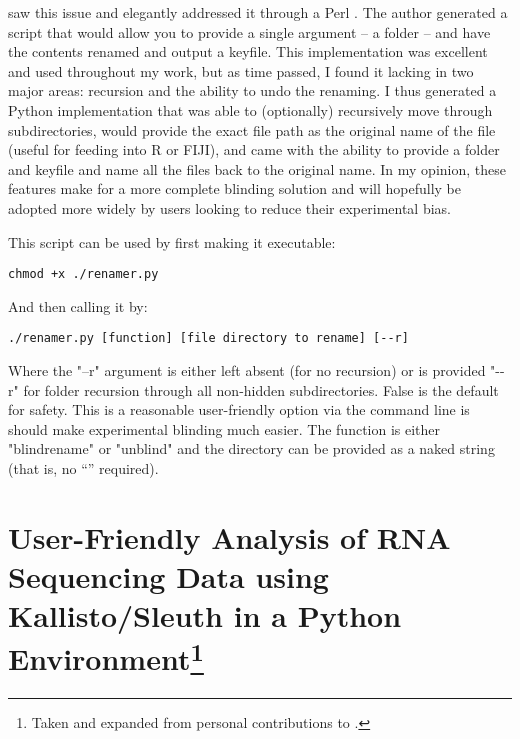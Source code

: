 \citet{Salter2016} saw this issue and elegantly addressed it through a Perl \citep{Wall2000}. The author generated a script that would allow you to provide a single argument -- a folder -- and have the contents renamed and output a keyfile. This implementation was excellent and used throughout my work, but as time passed, I found it lacking in two major areas: recursion and the ability to undo the renaming. I thus generated a Python implementation that was able to (optionally) recursively move through subdirectories, would provide the exact file path as the original name of the file (useful for feeding into R or FIJI), and came with the ability to provide a folder and keyfile and name all the files back to the original name. In my opinion, these features make for a more complete blinding solution and will hopefully be adopted more widely by users looking to reduce their experimental bias.

This script can be used by first making it executable:

\begin{code}
\begin{verbatim}
chmod +x ./renamer.py
\end{verbatim}
\end{code}

And then calling it by:

\begin{code}
\begin{verbatim}
./renamer.py [function] [file directory to rename] [--r]
\end{verbatim}
\end{code}

Where the "--r" argument is either left absent (for no recursion) or is provided "\hyp{}\hyp{}r" for folder recursion through all non-hidden subdirectories. False is the default for safety. This is a reasonable user-friendly option via the command line is should make experimental blinding much easier. The function is either "blindrename" or "unblind" and the directory can be provided as a naked string (that is, no ``'' required).

\section[User-Friendly Analysis of RNA Sequencing Data using Kallisto/Sleuth in a Python Environment]{User-Friendly Analysis of RNA Sequencing Data using Kallisto/Sleuth in a Python Environment\footnote{Taken and expanded from personal contributions to \citet{Saelens2022}.}}\label{rnaseq}

